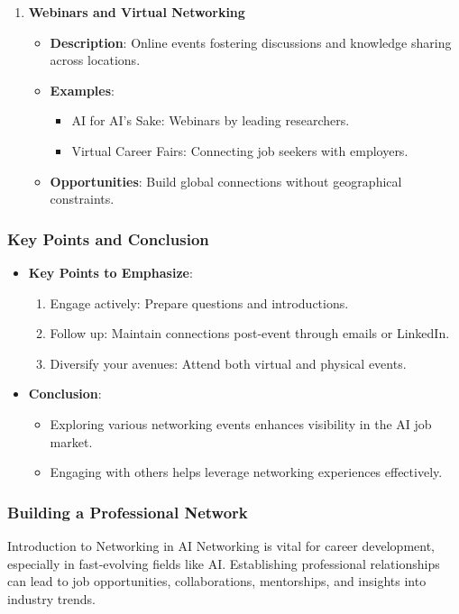 \documentclass{beamer}
\begin{document}
\begin{frame}[fragile]
\begin{enumerate}
        \item \textbf{Webinars and Virtual Networking}
            \begin{itemize}
                \item \textbf{Description}: Online events fostering discussions and knowledge sharing across locations.
                \item \textbf{Examples}:
                    \begin{itemize}
                        \item AI for AI’s Sake: Webinars by leading researchers.
                        \item Virtual Career Fairs: Connecting job seekers with employers.
                    \end{itemize}
                \item \textbf{Opportunities}: Build global connections without geographical constraints.
            \end{itemize}
    \end{enumerate}
\end{frame}

\begin{frame}[fragile]
    \frametitle{Key Points and Conclusion}
    \begin{itemize}
        \item \textbf{Key Points to Emphasize}:
            \begin{enumerate}
                \item Engage actively: Prepare questions and introductions.
                \item Follow up: Maintain connections post-event through emails or LinkedIn.
                \item Diversify your avenues: Attend both virtual and physical events.
            \end{enumerate}
        \item \textbf{Conclusion}:
            \begin{itemize}
                \item Exploring various networking events enhances visibility in the AI job market.
                \item Engaging with others helps leverage networking experiences effectively.
            \end{itemize}
    \end{itemize}
\end{frame}

\begin{frame}[fragile]
    \frametitle{Building a Professional Network}
    
    \begin{block}{Introduction to Networking in AI}
        Networking is vital for career development, especially in fast-evolving fields like AI. 
        Establishing professional relationships can lead to job opportunities, collaborations, mentorships, and insights into industry trends.
    \end{block}
\end{frame}
\end{document}
